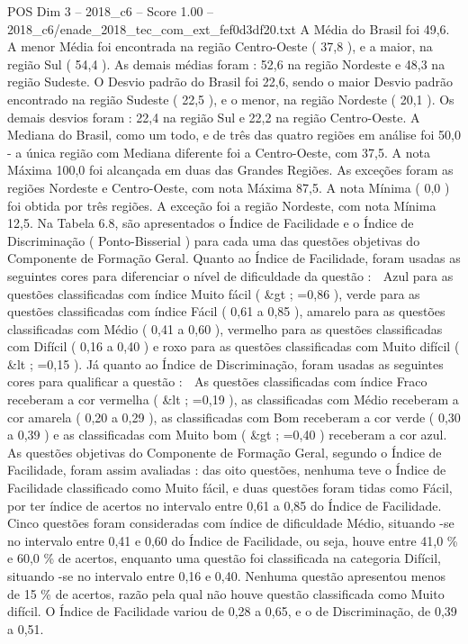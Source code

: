 \begin{textsample}{POS Dim 3 – 2018\_c6 – Score 1.00 – 2018\_c6/enade\_2018\_tec\_com\_ext\_fef0d3df20.txt}
A Média do Brasil foi 49,6.
A menor Média foi encontrada na região Centro-Oeste ( 37,8 ), e a maior, na região Sul ( 54,4 ).
As demais médias foram : 52,6 na região Nordeste e 48,3 na região Sudeste.
O Desvio padrão do Brasil foi 22,6, sendo o maior Desvio padrão encontrado na região Sudeste ( 22,5 ), e o menor, na região Nordeste ( 20,1 ).
Os demais desvios foram : 22,4 na região Sul e 22,2 na região Centro-Oeste.
A Mediana do Brasil, como um todo, e de três das quatro regiões em análise foi 50,0 - a única região com Mediana diferente foi a Centro-Oeste, com 37,5.
A nota Máxima 100,0 foi alcançada em duas das Grandes Regiões.
As exceções foram as regiões Nordeste e Centro-Oeste, com nota Máxima 87,5.
A nota Mínima ( 0,0 ) foi obtida por três regiões.
A exceção foi a região Nordeste, com nota Mínima 12,5.
Na Tabela 6.8, são apresentados o Índice de Facilidade e o Índice de Discriminação ( Ponto-Bisserial ) para cada uma das questões objetivas do Componente de Formação Geral.
Quanto ao Índice de Facilidade, foram usadas as seguintes cores para diferenciar o nível de dificuldade da questão :  Azul para as questões classificadas com índice Muito fácil ( \&gt ; =0,86 ), verde para as questões classificadas com índice Fácil ( 0,61 a 0,85 ), amarelo para as questões classificadas com Médio ( 0,41 a 0,60 ), vermelho para as questões classificadas com Difícil ( 0,16 a 0,40 ) e roxo para as questões classificadas com Muito difícil ( \&lt ; =0,15 ).
Já quanto ao Índice de Discriminação, foram usadas as seguintes cores para qualificar a questão :  As questões classificadas com índice Fraco receberam a cor vermelha ( \&lt ; =0,19 ), as classificadas com Médio receberam a cor amarela ( 0,20 a 0,29 ), as classificadas com Bom receberam a cor verde ( 0,30 a 0,39 ) e as classificadas com Muito bom ( \&gt ; =0,40 ) receberam a cor azul.
As questões objetivas do Componente de Formação Geral, segundo o Índice de Facilidade, foram assim avaliadas : das oito questões, nenhuma teve o Índice de Facilidade classificado como Muito fácil, e duas questões foram tidas como Fácil, por ter índice de acertos no intervalo entre 0,61 a 0,85 do Índice de Facilidade.
Cinco questões foram consideradas com índice de dificuldade Médio, situando -se no intervalo entre 0,41 e 0,60 do Índice de Facilidade, ou seja, houve entre 41,0 \% e 60,0 \% de acertos, enquanto uma questão foi classificada na categoria Difícil, situando -se no intervalo entre 0,16 e 0,40.
Nenhuma questão apresentou menos de 15 \% de acertos, razão pela qual não houve questão classificada como Muito difícil.
O Índice de Facilidade variou de 0,28 a 0,65, e o de Discriminação, de 0,39 a 0,51.

\end{textsample}

